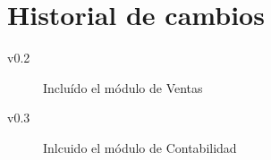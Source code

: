 \chapter*{Historial de cambios}
\begin{description}
  \item[v0.2] Incluído el módulo de Ventas
  \item[v0.3] Inlcuido el módulo de Contabilidad
\end{description}
